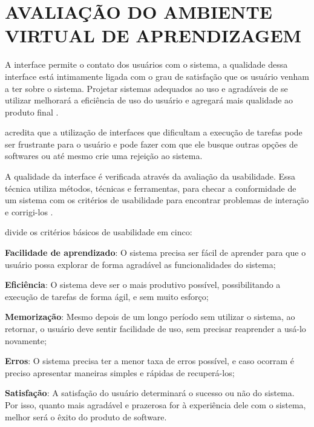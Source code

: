 \chapter{AVALIA\c{C}\~AO DO AMBIENTE VIRTUAL DE APRENDIZAGEM}
\label{chap:avaliacao-ambiente-virtual-aprendizagem}
A interface permite o contato dos usu\'arios com o sistema, a qualidade dessa interface est\'a intimamente ligada com o grau de 
satisfa\c{c}\~ao que os usu\'ario venham a ter sobre o sistema. Projetar sistemas adequados ao uso e agrad\'aveis de se utilizar
melhorar\'a a efici\^encia de uso do usu\'ario e agregará mais qualidade ao produto final \cite{antonino2015avaliacao}. 

 acredita que a utiliza\c{c}\~ao de interfaces que dificultam a execu\c{c}\~ao de tarefas 
pode ser frustrante para o usu\'ario e pode fazer com que ele busque outras op\c{c}\~oes de softwares ou at\'e mesmo crie uma 
rejei\c{c}\~ao ao sistema. 

A qualidade da interface \'e verificada atrav\'es da avalia\c{c}\~ao da usabilidade. Essa técnica utiliza m\'etodos, t\'ecnicas e 
ferramentas, para checar a conformidade de um sistema com os crit\'erios de usabilidade para encontrar problemas de intera\c{c}\~ao e 
corrigi-los \cite{antonino2015avaliacao}. 

 divide os critérios básicos de usabilidade em cinco:

\begin{alineascomponto}
	\item \textbf{Facilidade de aprendizado}: O sistema precisa ser fácil de aprender para que o usuário possa explorar de forma agradável as 
funcionalidades do sistema;
	\item \textbf{Eficiência}: O sistema deve ser o mais produtivo possível, possibilitando a execução de tarefas de forma ágil, e sem muito esforço;
	\item \textbf{Memorização}: Mesmo depois de um longo período sem utilizar o sistema, ao retornar, o usuário deve sentir facilidade de uso, sem 
precisar reaprender a usá-lo novamente;
	\item \textbf{Erros}: O sistema precisa ter a menor taxa de erros possível, e caso ocorram é preciso apresentar maneiras simples e rápidas de 
recuperá-los;
	\item \textbf{Satisfação}: A satisfação do usuário determinará o sucesso ou não do sistema. Por isso, quanto mais agradável e prazerosa for à 
experiência dele com o sistema, melhor será o êxito do produto de software.
\end{alineascomponto}

